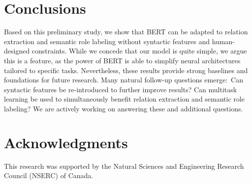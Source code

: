\documentclass[11pt,a4paper]{article}
\begin{document}
\section{Conclusions}

Based on this preliminary study, we show that BERT can be adapted to relation extraction and semantic role labeling without syntactic features and human-designed constraints. 
While we concede that our model is quite simple, we argue this is a feature, as the power of BERT is able to simplify neural architectures tailored to specific tasks.
Nevertheless, these results provide strong baselines and foundations for future research.
Many natural follow-up questions emerge:\
Can syntactic features be re-introduced to further improve results?
Can multitask learning be used to simultaneously benefit relation extraction and semantic role labeling?
We are actively working on answering these and additional questions.

\section*{Acknowledgments}

This research was supported by the Natural Sciences and Engineering Research Council (NSERC) of Canada. 
\end{document}

